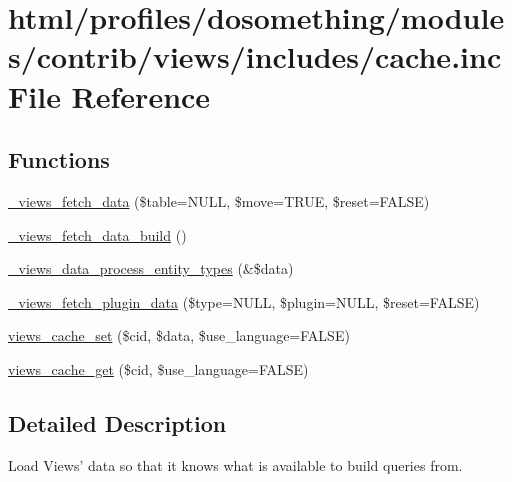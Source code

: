 \hypertarget{profiles_2dosomething_2modules_2contrib_2views_2includes_2cache_8inc}{
\section{html/profiles/dosomething/modules/contrib/views/includes/cache.inc File Reference}
\label{profiles_2dosomething_2modules_2contrib_2views_2includes_2cache_8inc}
}
\subsection*{Functions}
\begin{DoxyCompactItemize}
\item 
\hyperlink{profiles_2dosomething_2modules_2contrib_2views_2includes_2cache_8inc_a367769ad7eed921c7796b27dffb5e60a}{\_\-views\_\-fetch\_\-data} (\$table=NULL, \$move=TRUE, \$reset=FALSE)
\item 
\hyperlink{profiles_2dosomething_2modules_2contrib_2views_2includes_2cache_8inc_ab32ccf6a813b8037d2552ed0d54125f9}{\_\-views\_\-fetch\_\-data\_\-build} ()
\item 
\hyperlink{profiles_2dosomething_2modules_2contrib_2views_2includes_2cache_8inc_ab785ab7dc065d39a7789b7f98a701153}{\_\-views\_\-data\_\-process\_\-entity\_\-types} (\&\$data)
\item 
\hyperlink{profiles_2dosomething_2modules_2contrib_2views_2includes_2cache_8inc_a70217d418b60499c49aaa469712a8501}{\_\-views\_\-fetch\_\-plugin\_\-data} (\$type=NULL, \$plugin=NULL, \$reset=FALSE)
\item 
\hyperlink{profiles_2dosomething_2modules_2contrib_2views_2includes_2cache_8inc_a40508277eb295523eb45a067c8a84324}{views\_\-cache\_\-set} (\$cid, \$data, \$use\_\-language=FALSE)
\item 
\hyperlink{profiles_2dosomething_2modules_2contrib_2views_2includes_2cache_8inc_a3d4e5b21bcf4c7cc327190ece3251555}{views\_\-cache\_\-get} (\$cid, \$use\_\-language=FALSE)
\end{DoxyCompactItemize}


\subsection{Detailed Description}
Load Views' data so that it knows what is available to build queries from. 

